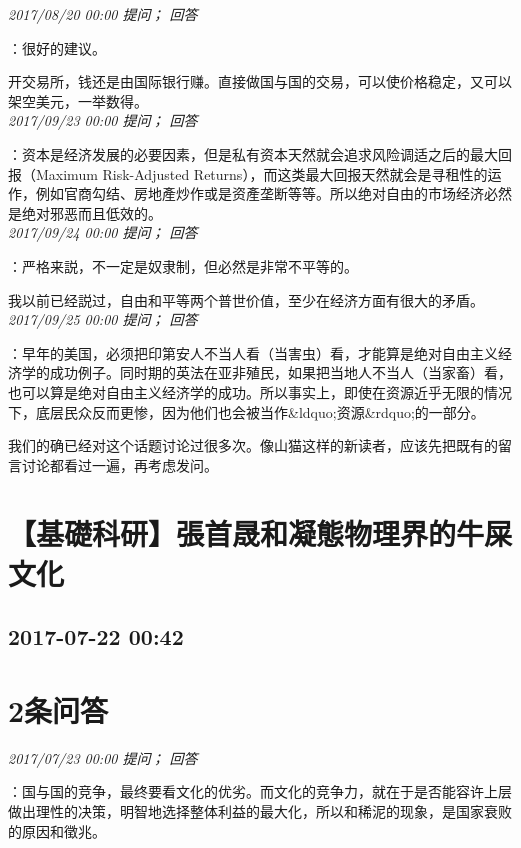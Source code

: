 \documentclass[twocolumn]{ctexart}
\begin{document}
\textit{\hfill\noindent\small 2017/08/20 00:00 提问； 回答}

：很好的建议。

开交易所，钱还是由国际银行赚。直接做国与国的交易，可以使价格稳定，又可以架空美元，一举数得。\\

\textit{\hfill\noindent\small 2017/09/23 00:00 提问； 回答}

：资本是经济发展的必要因素，但是私有资本天然就会追求风险调适之后的最大回报（Maximum Risk-Adjusted Returns），而这类最大回报天然就会是寻租性的运作，例如官商勾结、房地產炒作或是资產垄断等等。所以绝对自由的市场经济必然是绝对邪恶而且低效的。\\

\textit{\hfill\noindent\small 2017/09/24 00:00 提问； 回答}

：严格来説，不一定是奴隶制，但必然是非常不平等的。

我以前已经説过，自由和平等两个普世价值，至少在经济方面有很大的矛盾。\\

\textit{\hfill\noindent\small 2017/09/25 00:00 提问； 回答}

：早年的美国，必须把印第安人不当人看（当害虫）看，才能算是绝对自由主义经济学的成功例子。同时期的英法在亚非殖民，如果把当地人不当人（当家畜）看，也可以算是绝对自由主义经济学的成功。所以事实上，即使在资源近乎无限的情况下，底层民众反而更惨，因为他们也会被当作\&ldquo;资源\&rdquo;的一部分。

我们的确已经对这个话题讨论过很多次。像山猫这样的新读者，应该先把既有的留言讨论都看过一遍，再考虑发问。\\


\section{【基礎科研】張首晟和凝態物理界的牛屎文化}
\subsection{2017-07-22 00:42}


\section{2条问答}

\textit{\hfill\noindent\small 2017/07/23 00:00 提问； 回答}

：国与国的竞争，最终要看文化的优劣。而文化的竞争力，就在于是否能容许上层做出理性的决策，明智地选择整体利益的最大化，所以和稀泥的现象，是国家衰败的原因和徵兆。
\end{document}
